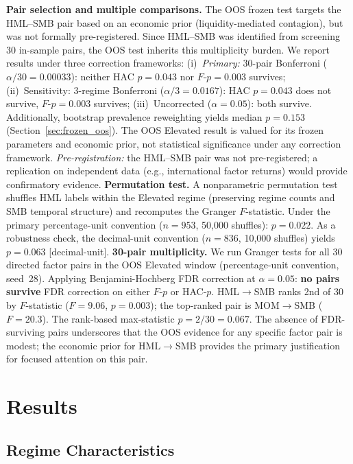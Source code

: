 \documentclass[sigconf,anonymous]{acmart}
\begin{document}
\textbf{Pair selection and multiple comparisons.} The OOS frozen test targets
the HML--SMB pair based on an economic prior (liquidity-mediated contagion),
but was not formally pre-registered. Since HML--SMB was identified from screening
30 in-sample pairs, the OOS test inherits this multiplicity burden.
We report results under three correction frameworks:
(i)~\emph{Primary:} 30-pair Bonferroni ($\alpha/30 = 0.00033$): neither HAC $p = 0.043$
nor $F$-$p = 0.003$ survives;
(ii)~Sensitivity: 3-regime Bonferroni ($\alpha/3 = 0.0167$): HAC $p = 0.043$
does not survive, $F$-$p = 0.003$ survives;
(iii)~Uncorrected ($\alpha = 0.05$): both survive.
Additionally, bootstrap prevalence reweighting
yields median $p = 0.153$ (Section~\ref{sec:frozen_oos}).
The OOS Elevated result is valued for its frozen parameters and
economic prior, not statistical significance under any correction framework.
\emph{Pre-registration:} the HML--SMB pair was not pre-registered;
a replication on independent data (e.g., international factor
returns) would provide confirmatory evidence.
\textbf{Permutation test.} A nonparametric permutation
test~\cite{good2005permutation} shuffles HML labels within the Elevated regime
(preserving regime counts and SMB temporal structure) and recomputes the Granger
$F$-statistic. Under the primary percentage-unit convention ($n = 953$,
50{,}000 shuffles): $p = 0.022$. As a robustness check,
the decimal-unit convention ($n = 836$, 10{,}000 shuffles) yields
$p = 0.063$ [decimal-unit].
\textbf{30-pair multiplicity.} We run Granger tests for all 30 directed factor pairs
in the OOS Elevated window (percentage-unit convention, seed~28).
Applying Benjamini-Hochberg FDR correction at $\alpha = 0.05$:
\textbf{no pairs survive} FDR correction on either $F$-$p$ or HAC-$p$.
HML$\to$SMB ranks 2nd of 30 by $F$-statistic
($F = 9.06$, $p = 0.003$); the top-ranked pair is MOM$\to$SMB ($F = 20.3$).
The rank-based max-statistic $p = 2/30 = 0.067$.
The absence of FDR-surviving pairs underscores that the OOS evidence for any
specific factor pair is modest; the economic prior for HML$\to$SMB provides the
primary justification for focused attention on this pair.

\section{Results}

\subsection{Regime Characteristics}
\end{document}
